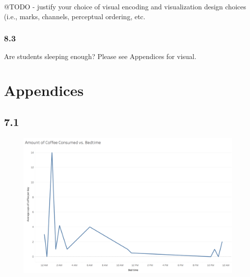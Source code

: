\documentclass{neu_handout}
\begin{document}
@TODO - justify your choice of visual encoding and visualization design choices (i.e., marks, channels,
perceptual ordering, etc.

\subsubsection*{8.3}
Are students sleeping enough? Please see Appendices for visual.\\

\appendix
\section{Appendices}

\subsection*{7.1}
\begin{figure}[h]
\centering
{
\includegraphics[width=0.7\linewidth]{bedtime_coffee}
}
\end{figure}
\end{document}
